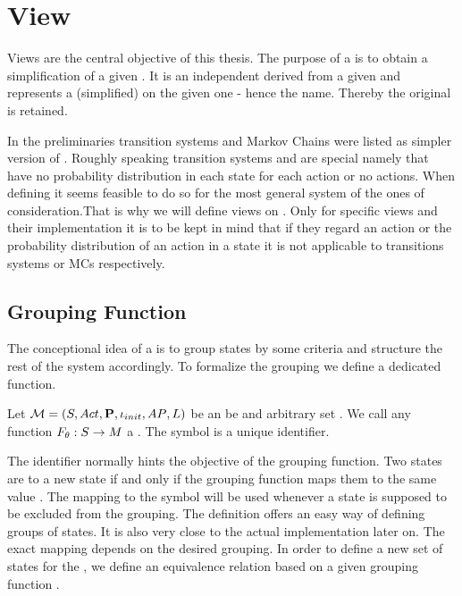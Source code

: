 \documentclass[preview]{standalone}
\begin{document}
	
\section{View}
Views are the central objective of this thesis. The purpose of a \viewN is to obtain a simplification of a given \chgphN.  It is an independent \chgphN derived from a given \chgphN and represents a (simplified) \viewN on the given one - hence the name. Thereby the original \chgphN is retained.

In the preliminaries transition systems and Markov Chains were listed as simpler version of \mdpsN. Roughly speaking transition systems and \mdpsN are special \mdpsN namely that have no probability distribution in each state for each action or no actions. When defining \viewsN it seems feasible to do so for the most general system of the ones of consideration.That is why we will define views on \mdpsN. Only for specific views and their implementation it is to be kept in mind that if they regard an action or the probability distribution of an action in a state it is not applicable to transitions systems or MCs respectively. 

\subsection{Grouping Function}
The conceptional idea of a \viewN is to group states by some criteria and structure the rest of the system accordingly. To formalize the grouping we define a dedicated function.

\begin{definition}
	Let ${{{\mathcal{M}}}} = {{({S}, {Act}, {\textbf{P}}, {\iota_{init}}, {AP}, {L})}}$ be \chgphN an \arbset be and arbitrary set . We call any function ${F_{{\theta}}} : {S} \to {\ensuremath{{M}}}$ a \emph{\grpfctN}. The symbol \viewppty is a unique identifier.
	
	\label{def:grpfct}
\end{definition}

The identifier \viewppty normally hints the objective of the grouping function. Two states are  to a new state if and only if the grouping function maps them to the same value . The mapping to the symbol \remelem will be used whenever a state is supposed to be excluded from the grouping. The definition offers an easy way of defining groups of states. It is also very close to the actual implementation later on. The exact mapping depends on the desired grouping. In order to define a new set of states for the \viewN, we define an equivalence relation \eqrelview based on a given grouping function \grpfct.
\end{document}
